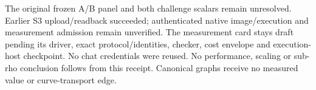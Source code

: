\documentclass[10pt]{article}
\begin{document}
\medskip\noindent The original frozen A/B panel and both challenge scalars
remain unresolved. Earlier S3 upload/readback succeeded; authenticated native
image/execution and measurement admission remain unverified. The measurement
card stays draft pending its driver, exact protocol/identities, checker,
cost envelope and execution-host checkpoint. No chat credentials were reused.
No performance, scaling or sub-rho conclusion follows from this receipt.
Canonical graphs receive no measured value or curve-transport edge.
\end{document}
